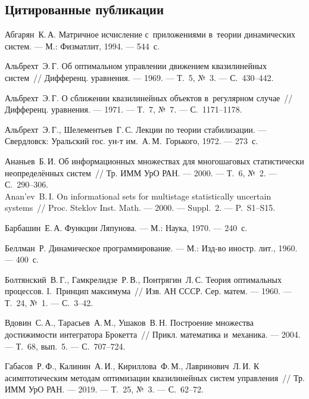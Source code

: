 \documentclass[../main.tex]{subfiles}
\begin{document}
\clearpage
\begin{thebibliography}{99}

\subsection*{Цитированные публикации}

Абгарян~К.\,А. Матричное исчисление с~приложениями в~теории динамических систем. --- М.: Физматлит, 1994. --- 544~с.

Альбрехт~Э.\,Г. Об оптимальном управлении движением квазилинейных систем~// Дифференц. уравнения. --- 1969. --- Т.~5, №~3. --- С.~430--442.

Альбрехт~Э.\,Г. О сближении квазилинейных объектов в~регулярном случае~// Дифференц. уравнения. --- 1971. --- Т.~7, №~7. --- С.~1171--1178.

Альбрехт~Э.\,Г., Шелементьев~Г.\,С. Лекции по теории стабилизации. --- Свердловск: Уральский гос. ун-т им.~А.\,М.~Горького, 1972. --- 273~с.

Ананьев~Б.\,И. Об информационных множествах для многошаговых статистически неопределённых систем~// Тр. ИММ УрО РАН. --- 2000. --- Т.~6, №~2. --- С.~290--306. \\
Anan'ev~B.\,I. On informational sets for multistage statistically uncertain systems~// Proc. Steklov Inst. Math. --- 2000. --- Suppl.~2. --- P.~S1--S15.


Барбашин~Е.\,А. Функции Ляпунова. --- М.: Наука, 1970. --- 240~с.

Беллман~Р. Динамическое программирование. --- М.: Изд-во иностр. лит., 1960. --- 400~с.

Болтянский~В.\,Г., Гамкрелидзе~Р.\,В., Понтрягин~Л.\,С. Теория оптимальных процессов. I.~Принцип максимума~// Изв. АН СССР. Сер. матем. --- 1960. --- Т.~24, №~1. --- С.~3--42.

Вдовин~С.\,А., Тарасьев~А.\,М., Ушаков~В.\,Н. Построение множества достижимости интегратора Брокетта~// Прикл. математика и~механика. --- 2004. --- Т.~68, вып.~5. --- С.~707--724.

Габасов~Р.\,Ф., Калинин~А.\,И., Кириллова~Ф.\,М., Лавринович~Л.\,И. К асимптотическим методам оптимизации квазилинейных систем управления~// Тр. ИММ УрО РАН. --- 2019. --- Т.~25, №~3. --- С.~62--72.


\end{thebibliography}
\end{document}
